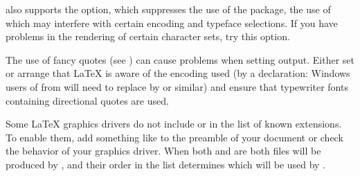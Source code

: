 \begin{Details}
 also supports the \samp{[noae]} option, which
suppresses the use of the  package, the use of which may
interfere with certain encoding and typeface selections.  If you have
problems in the rendering of certain character sets, try this option.

The use of fancy quotes (see ) can cause problems
when setting \R{} output.  Either set
 or arrange that LaTeX is
aware of the encoding used (by a 
declaration: Windows users of  from 
will need to replace  by  or similar) and
ensure that typewriter fonts containing directional quotes are used.

Some LaTeX graphics drivers do not include  or 
in the list of known extensions.  To enable them, add something like
 to the preamble of
your document or check the behavior of your graphics driver.  When
both  and  are  both files will be
produced by , and their order in the
 list determines which will be used by
.
\end{Details}
%
